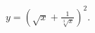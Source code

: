 \label{problemd/dx((sqrt(x)+1/sqrt[3](x))^2)} $\displaystyle y=\left(\sqrt{x}+ \frac{1}{ \sqrt[3]{x}}\right)^2$.


